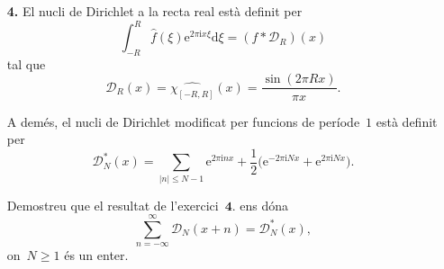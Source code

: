 \documentclass[a4paper]{article}
\theoremstyle{definition}
\newcommand{\iu}{\mathrm{i}}
\newcommand{\e}{\mathrm{e}}
\providecommand{\uppi}{\pi}
\newcommand{\diff}{\mathrm{d}}
\newcommand{\abs}[1]{\lvert{#1}\rvert}
\newcommand{\D}{\mathcal{D}}
\begin{document}
\begin{enumerate}
    \item[\textbf{4.}] El nucli de Dirichlet a la recta real està definit per
        \[
            \int_{-R}^{R}\widehat{f}(\xi)\e^{2\uppi\iu x\xi}\diff\xi
            = (f\ast \D_{R})(x)
        \]
        tal que
        \[
            \D_{R}(x) = \widehat{\chi_{[-R,R]}}(x)
            = \frac{\sin(2\uppi Rx)}{\uppi x}.
        \]

        A demés, el nucli de Dirichlet modificat per funcions de període~\(1\)
        està definit per
        \[
            \D^{\ast}_{N}(x)
            = \sum_{\abs{n} \leq N-1} \e^{2\uppi\iu nx}
            + \frac{1}{2}\bigl(\e^{-2\uppi\iu Nx} + \e^{2\uppi\iu Nx}\bigr).
        \]

        Demostreu que el resultat de l'exercici~\(\textbf{4.}\) ens dóna
        \[
            \sum_{n=-\infty}^{\infty} \D_{N}(x+n) = \D^{\ast}_{N}(x),
        \]
        on~\(N\geq1\) és un enter.
\end{enumerate}
\end{document}
